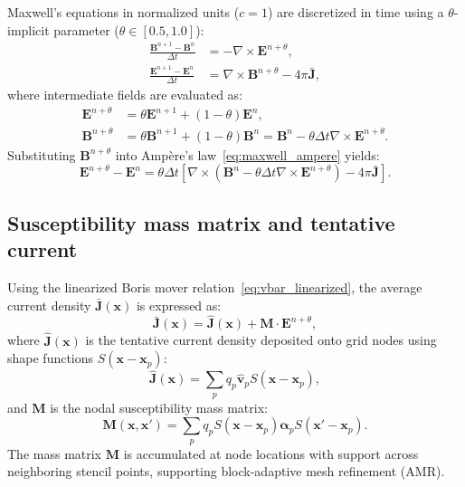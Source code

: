 \documentclass[a4paper, 11pt]{article}
\begin{document}
Maxwell's equations in normalized units ($c=1$) are discretized in time using a $\theta$-implicit parameter ($\theta \in [0.5, 1.0]$):
\begin{align}
\frac{\mathbf{B}^{n+1} - \mathbf{B}^n}{\Delta t} &= -\nabla \times \mathbf{E}^{n+\theta}, \label{eq:maxwell_faraday} \\
\frac{\mathbf{E}^{n+1} - \mathbf{E}^n}{\Delta t} &= \nabla \times \mathbf{B}^{n+\theta} - 4\pi \bar{\mathbf{J}}, \label{eq:maxwell_ampere}
\end{align}
where intermediate fields are evaluated as:
\begin{align}
\mathbf{E}^{n+\theta} &= \theta \mathbf{E}^{n+1} + (1-\theta)\mathbf{E}^n, \\
\mathbf{B}^{n+\theta} &= \theta \mathbf{B}^{n+1} + (1-\theta)\mathbf{B}^n = \mathbf{B}^n - \theta \Delta t \nabla \times \mathbf{E}^{n+\theta}.
\end{align}
Substituting $\mathbf{B}^{n+\theta}$ into Amp\`ere's law~\eqref{eq:maxwell_ampere} yields:
\begin{equation}
\mathbf{E}^{n+\theta} - \mathbf{E}^n = \theta \Delta t \left[ \nabla \times \left(\mathbf{B}^n - \theta \Delta t \nabla \times \mathbf{E}^{n+\theta}\right) - 4\pi \bar{\mathbf{J}} \right].
\label{eq:ampere_intermediate}
\end{equation}

\subsection{Susceptibility mass matrix and tentative current}

Using the linearized Boris mover relation~\eqref{eq:vbar_linearized}, the average current density $\bar{\mathbf{J}}(\mathbf{x})$ is expressed as:
\begin{equation}
\bar{\mathbf{J}}(\mathbf{x}) = \hat{\mathbf{J}}(\mathbf{x}) + \mathbf{M} \cdot \mathbf{E}^{n+\theta},
\end{equation}
where $\hat{\mathbf{J}}(\mathbf{x})$ is the tentative current density deposited onto grid nodes using shape functions $S(\mathbf{x} - \mathbf{x}_p)$:
\begin{equation}
\hat{\mathbf{J}}(\mathbf{x}) = \sum_p q_p \hat{\mathbf{v}}_p S(\mathbf{x} - \mathbf{x}_p),
\end{equation}
and $\mathbf{M}$ is the nodal susceptibility mass matrix:
\begin{equation}
\mathbf{M}(\mathbf{x}, \mathbf{x}') = \sum_p q_p S(\mathbf{x} - \mathbf{x}_p) \boldsymbol{\alpha}_p S(\mathbf{x}' - \mathbf{x}_p).
\end{equation}
The mass matrix $\mathbf{M}$ is accumulated at node locations with support across neighboring stencil points, supporting block-adaptive mesh refinement (AMR).
\end{document}
